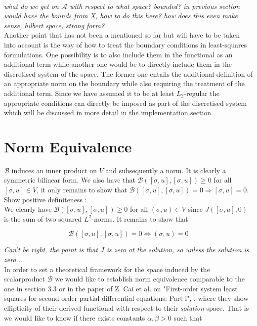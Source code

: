 \documentclass[../draft_1.tex]{subfiles}
\begin{document}
\smallskip
\\
\textit{what do we get on $\mathcal{A}$ with respect to what space? bounded? in previous section would have the bounds from X, how to do this here? how does this even make sense, hilbert space, strong form?}
\smallskip 
\\
Another point that has not been a mentioned so far but will have to be taken into account is the way of how to treat the boundary conditions in least-squares formulations. One possibility is to also include them in the functional as an additional term while another one would be to directly include them in the discretised system of the space. The former one entails the additional definition of an appropriate norm on the boundary while also requiring the treatment of the additional term. Since we have assumed it to be at least $L_2$-regular the appropriate conditions can directly be imposed as part of the discretised system which will be discussed in more detail in the implementation section.

\section{Norm Equivalence}

$\mathcal{B}$ induces an inner product on $V$ and subsequently a norm. It is clearly a symmetric bilinear form. We also have that $ \mathcal{B} ([\sigma, u], [\sigma, u]) \geq 0 $ for all $[\sigma, u] \in V$, it only remains to show that $ \mathcal{B} ([\sigma, u], [\sigma, u]) = 0 \Rightarrow [\sigma, u] = 0 $.  
Show positive definiteness : \\
We clearly have $\mathcal{B}([\sigma, u], [\sigma, u]) \geq 0$ for all $(\sigma, u) \in V$ since $J([\sigma, u], 0)$ is the sum of two squared $L^2$-norms. It remains to show that 
\begin{ceqn}
	\begin{equation}
\mathcal{B}([\sigma, u], [\sigma, u]) = 0  \iff (\sigma, u) = 0
\end{equation}
\end{ceqn}
\textit{Can't be right, the point is that $J$ is zero at the solution, so unless the solution is zero ...}
\bigskip
\\
In order to set a theoretical framework for the space induced by the scalarproduct $\mathcal{B}$ we would like to establish norm equivalence comparable to the one in section 3.3 or in the paper of Z. Cai et al. on "First-order system least squares for second-order partial differential equations: Part l", \cite{cai1994first}, where they show ellipticity of their derived functional with respect to their \textit{solution} space. That is we would like to know if there exists constants $\alpha, \beta > 0$ such that
\end{document}
